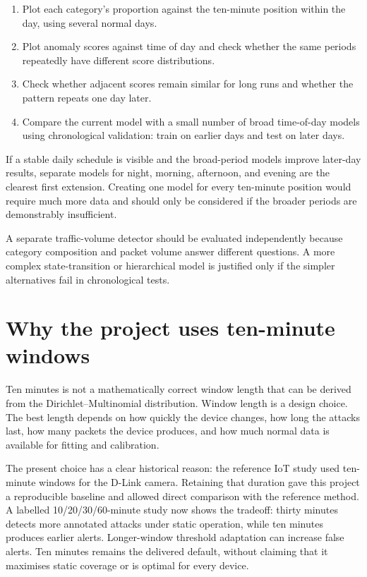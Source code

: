 \documentclass[11pt,a4paper]{article}
\begin{document}
\begin{enumerate}
  \item Plot each category's proportion against the ten-minute position within
        the day, using several normal days.
  \item Plot anomaly scores against time of day and check whether the same
        periods repeatedly have different score distributions.
  \item Check whether adjacent scores remain similar for long runs and whether
        the pattern repeats one day later.
  \item Compare the current model with a small number of broad time-of-day
        models using chronological validation: train on earlier days and test
        on later days.
\end{enumerate}

If a stable daily schedule is visible and the broad-period models improve
later-day results, separate models for night, morning, afternoon, and evening
are the clearest first extension.  Creating one model for every ten-minute
position would require much more data and should only be considered if the
broader periods are demonstrably insufficient.

A separate traffic-volume detector should be evaluated independently because
category composition and packet volume answer different questions.  A more
complex state-transition or hierarchical model is justified only if the
simpler alternatives fail in chronological tests.

\section{Why the project uses ten-minute windows}

Ten minutes is not a mathematically correct window length that can be derived
from the Dirichlet--Multinomial distribution.  Window length is a design
choice.  The best length depends on how quickly the device changes, how long
the attacks last, how many packets the device produces, and how much normal
data is available for fitting and calibration.

The present choice has a clear historical reason: the reference IoT study used
ten-minute windows for the D-Link camera.  Retaining that duration gave this
project a reproducible baseline and allowed direct comparison with the
reference method. A labelled 10/20/30/60-minute study now shows the tradeoff:
thirty minutes detects more annotated attacks under static operation, while
ten minutes produces earlier alerts. Longer-window threshold adaptation can
increase false alerts. Ten minutes remains the delivered default, without
claiming that it maximises static coverage or is optimal for every device.
\end{document}
